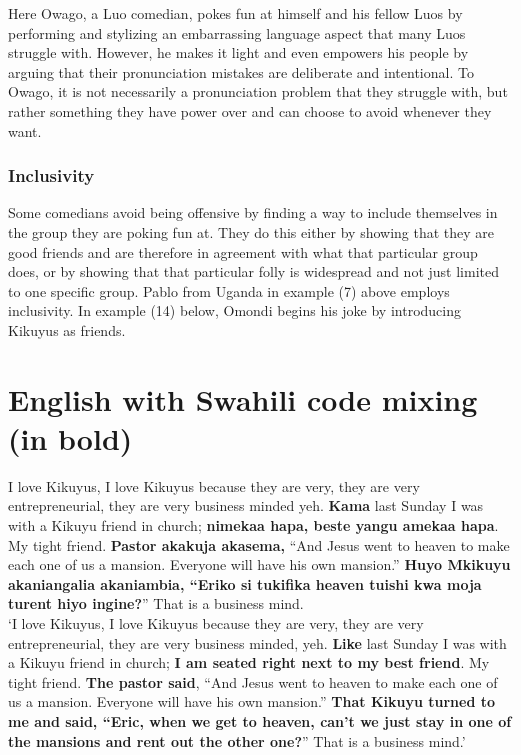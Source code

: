 \documentclass[output=paper]{langsci/langscibook}
\begin{document}
  Here Owago, a Luo comedian, pokes fun at himself and his fellow Luos by performing and stylizing an embarrassing language aspect that many Luos struggle with. However, he makes it light and even empowers his people by arguing that their pronunciation mistakes are deliberate and intentional. To Owago, it is not necessarily a pronunciation problem that they struggle with, but rather something they have power over and can choose to avoid whenever they want.

\subsection{Inclusivity }

   Some comedians avoid being offensive by finding a way to include themselves in the group they are poking fun at. They do this either by showing that they are good friends and are therefore in agreement with what that particular group does, or by showing that that particular folly is widespread and not just limited to one specific group. Pablo from Uganda in example (7) above employs inclusivity. In example (14) below, Omondi begins his joke by introducing Kikuyus as friends. 

\chapter{English with Swahili code mixing (in bold)}
\gll I love Kikuyus, I love Kikuyus because they are very, they are very entrepreneurial, they are very business minded yeh. \textbf{Kama} last Sunday I was with a Kikuyu friend in church; \textbf{nimekaa hapa, beste yangu amekaa hapa}. My tight friend. \textbf{Pastor akakuja akasema,} “And Jesus went to heaven to make each one of us a mansion. Everyone will have his own mansion.” \textbf{Huyo Mkikuyu akaniangalia akaniambia, “Eriko si tukifika heaven tuishi kwa moja turent hiyo ingine?}” That is a business mind. \\
\glt ‘I love Kikuyus, I love Kikuyus because they are very, they are very entrepreneurial, they are very business minded, yeh. \textbf{Like} last Sunday I was with a Kikuyu friend in church; \textbf{I am seated right next to my best friend}. My tight friend. \textbf{The pastor said}, “And Jesus went to heaven to make each one of us a mansion. Everyone will have his own mansion.” \textbf{That Kikuyu turned to me and said, “Eric, when we get to heaven, can’t we just stay in one of the mansions and rent out the other one?}” That is a business mind.’ \citep{Quarshe2015}
\z
\end{document}
